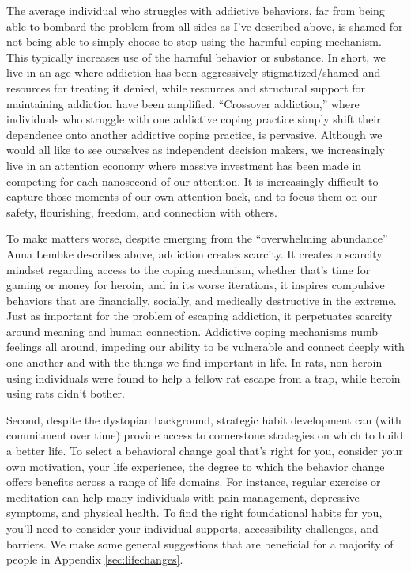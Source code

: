\documentclass[12pt,letterpaper]{book}
\begin{document}
The average individual who struggles with addictive behaviors, far from being able to bombard the problem from all sides as I've described above, is shamed for not being able to simply choose to stop using the harmful coping mechanism. This typically increases use of the harmful behavior or substance. In short, we live in an age where addiction has been aggressively stigmatized/shamed and resources for treating it denied, while resources and structural support for maintaining addiction have been amplified. “Crossover addiction,” where individuals who struggle with one addictive coping practice simply shift their dependence onto another addictive coping practice, is pervasive. Although we would all like to see ourselves as independent decision makers, we increasingly live in an attention economy where massive investment has been made in competing for each nanosecond of our attention. It is increasingly difficult to capture those moments of our own attention back, and to focus them on our safety, flourishing, freedom, and connection with others.

To make matters worse, despite emerging from the “overwhelming abundance” Anna Lembke describes above, addiction creates scarcity. It creates a scarcity mindset regarding access to the coping mechanism, whether that's time for gaming or money for heroin, and in its worse iterations, it inspires compulsive behaviors that are financially, socially, and medically destructive in the extreme. Just as important for the problem of escaping addiction, it perpetuates scarcity around meaning and human connection. Addictive coping mechanisms numb feelings all around, impeding our ability to be vulnerable and connect deeply with one another and with the things we find important in life. In rats, non-heroin-using individuals were found to help a fellow rat escape from a trap, while heroin using rats didn't bother.

Second, despite the dystopian background, strategic habit development can (with commitment over time) provide access to cornerstone strategies on which to build a better life. To select a behavioral change goal that's right for you, consider your own motivation, your life experience, the degree to which the behavior change offers benefits across a range of life domains. For instance, regular exercise or meditation can help many individuals with pain management, depressive symptoms, and physical health. To find the right foundational habits for you, you'll need to consider your individual supports, accessibility challenges, and barriers. We make some general suggestions that are beneficial for a majority of people in Appendix \ref{sec:lifechanges}.
\end{document}
